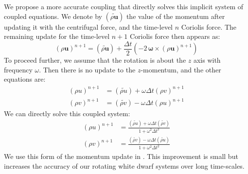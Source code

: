 \documentclass[12pt]{article}
\begin{document}
We propose a more accurate coupling that directly solves this implicit system of coupled 
equations. We denote by $(\widetilde{\rho \mathbf{u}})$ the value of the momentum after 
updating it with the centrifugal force, and the time-level $n$ Coriolis force. The remaining 
update for the time-level $n+1$ Coriolis force then appears as:
\begin{equation}
  (\rho \mathbf{u})^{n+1} = (\widetilde{\rho\mathbf{u}}) + \frac{\Delta t}{2} \left(-2\, {\bm\omega} \times (\rho\mathbf{u})^{n+1}\right)
\end{equation}
To proceed further, we assume that the rotation is about the $z$ axis with frequency $\omega$. 
Then there is no update to the $z$-momentum, and the other equations are:
\begin{align}
  (\rho u)^{n+1} &= (\widetilde{\rho u}) + \omega \Delta t (\rho v)^{n+1} \\
  (\rho v)^{n+1} &= (\widetilde{\rho v}) - \omega \Delta t (\rho u)^{n+1}
\end{align} 
We can directly solve this coupled system:
\begin{align}
  (\rho u)^{n+1} &= \frac{ (\widetilde{\rho u}) + \omega \Delta t (\widetilde{\rho v})}{1 + \omega^2 \Delta t^2} \\
  (\rho v)^{n+1} &= \frac{ (\widetilde{\rho v}) - \omega \Delta t (\widetilde{\rho u})}{1 + \omega^2 \Delta t^2}
\end{align}
We use this form of the momentum update in \castro. This improvement is small
but increases the accuracy of our rotating white dwarf systems over long time-scales.
\end{document}
